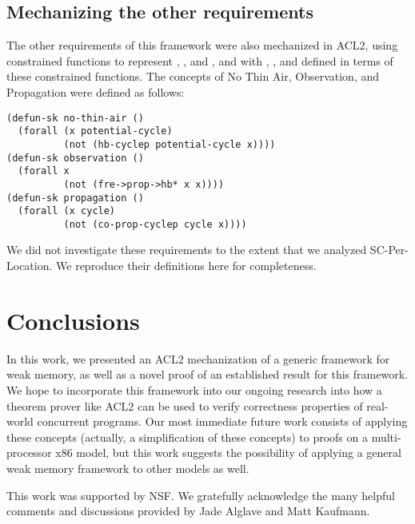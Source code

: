 \documentclass[]{eptcs}
\begin{document}
\subsection{Mechanizing the other requirements}
The other requirements of this framework were also mechanized in ACL2, using constrained functions to represent , , and , and with , , and  defined in terms of these constrained functions. The concepts of No Thin Air, Observation, and Propagation were defined as follows:
\begin{verbatim}
(defun-sk no-thin-air ()
  (forall (x potential-cycle)
          (not (hb-cyclep potential-cycle x))))
(defun-sk observation ()
  (forall x
          (not (fre->prop->hb* x x))))
(defun-sk propagation ()
  (forall (x cycle)
          (not (co-prop-cyclep cycle x))))
\end{verbatim}
We did not investigate these requirements to the extent that we analyzed SC-Per-Location. We reproduce their definitions here for completeness.

\section{Conclusions}

In this work, we presented an ACL2 mechanization of a generic framework for weak memory, as well as a novel proof of an established result for this framework. We hope to incorporate this framework into our ongoing research into how a theorem prover like ACL2 can be used to verify correctness properties of real-world concurrent programs. Our most immediate future work consists of applying these concepts (actually, a simplification of these concepts) to proofs on a multi-processor x86 model, but this work suggests the possibility of applying a general weak memory framework to other models as well.

This work was supported by NSF. We gratefully acknowledge the many helpful comments and discussions provided by Jade Alglave and Matt Kaufmann.



\end{document}
